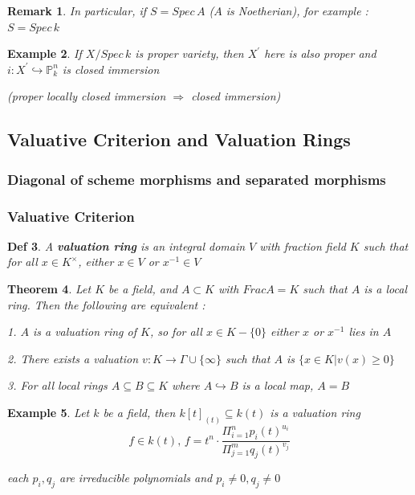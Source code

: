 \documentclass{article}
\newtheorem{theorem}{Theorem}[section]
\newtheorem{definition}[theorem]{Def}
\newtheorem{example}[theorem]{Example}
\newtheorem{remark}[theorem]{Remark}
\begin{document}
\begin{remark}
    In particular, if $S=Spec\,A$ ($A$ is Noetherian), for example : $S=Spec\,k$
\end{remark}

\begin{example}
    If $X/Spec\,k$ is proper variety, then $X^\prime$ here is also proper and $i:X^\prime\hookrightarrow \mathbb P_k^n$ is closed immersion

    (proper locally closed immersion $\Rightarrow$ closed immersion)
\end{example}







\newpage
\subsection{Valuative Criterion and Valuation Rings}
\subsubsection{Diagonal of scheme morphisms and separated morphisms}

\subsubsection{Valuative Criterion}

\begin{definition}
    A \textbf{valuation ring} is an integral domain $V$ with fraction field $K$ such that for all $x\in K^{\times}$, either $x\in V$ or $x^{-1}\in V$
\end{definition}

\begin{theorem}
Let $K$ be a field, and $A \subset K$ with $Frac A = K$ such that $A$ is a local ring. Then the
following are equivalent :

1. $A$ is a valuation ring of $K$, so for all $x \in K-\{0\}$ either $x$ or $x^{-1}$ lies in $A$

2. There exists a valuation $v : K \to \Gamma \cup \{\infty\}$ such that $A$ is $\{x \in K | v(x) \geq 0\}$

3. For all local rings $A \subseteq B \subseteq K$ where $A \hookrightarrow B$ is a local map, $A = B$
\end{theorem}

\begin{example}
    Let $k$ be a field, then $k[t]_{(t)}\subseteq k(t)$ is a valuation ring
$$f\in k(t),\,f=t^n \cdot \frac{\Pi_{i=1}^n p_i(t)^{u_i}}{\Pi_{j=1}^m q_j(t)^{v_j}}$$

each $p_i,q_j$ are irreducible polynomials and $p_i\ne0,q_j\ne0$
\end{example}
\end{document}
